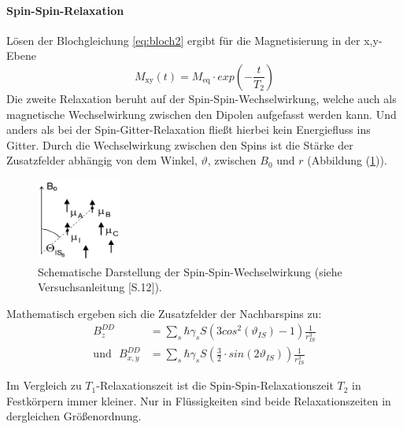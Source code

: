\paragraph{Spin-Spin-Relaxation}
Lösen der Blochgleichung \ref{eq:bloch2} ergibt für die Magnetisierung in der
x,y-Ebene
\begin{equation*}
	M_{\text{xy}}(t) = M_{\text{eq}} \cdot exp\left( - \frac{t}{T_2} \right)
	\label{eq:Mxy}
\end{equation*}
Die zweite Relaxation be{\-}ruht auf der Spin-Spin-Wechselwirkung, welche auch als magnetische Wechselwirkung zwischen den Dipolen aufgefasst werden kann.
Und anders als bei der Spin-Gitter-Relaxation flie{\ss}t hierbei kein Energiefluss ins Gitter.
Durch die Wechselwirkung zwischen den Spins ist die St\"{a}rke der Zusatzfelder abh\"{a}ngig von dem Winkel, $\vartheta$, zwischen $B_0$ und $r$ (Abbildung (\ref{SpinSpin})).
\begin{figure}
	\centering
	\includegraphics[width=0.25\textwidth]{Plots/spin_spin.png}
	\caption{Schematische Darstellung der Spin-Spin-Wechselwirkung (siehe Versuchsanleitung \cite{Anleitung}[S.12]).}
	\label{SpinSpin}
\end{figure}
Mathematisch ergeben sich die Zusatzfelder der Nachbarspins zu:
\begin{align*}
	B_z^{DD} &= \sum_s \hbar \gamma_s S \left( 3 cos^2 \left(\vartheta_{IS}\right) - 1 \right) \frac{1}{r_{IS}^3} \\
	\text{und} \, \, \, \, B_{x,y}^{DD} &= \sum_s \hbar \gamma_s S \left( \frac{3}{2} \cdot sin\left(2 \vartheta_{IS}\right) \right) \frac{1}{r_{IS}^3}
\end{align*}

Im Vergleich zu $T_1$-Relaxationszeit ist die Spin-Spin-Relaxationszeit $T_2$ in Festk\"{o}rpern immer kleiner.
Nur in Fl\"{u}ssigkeiten sind beide Relaxationszeiten in dergleichen Gr\"{o}{\ss}en{\-}ord{\-}nung.

